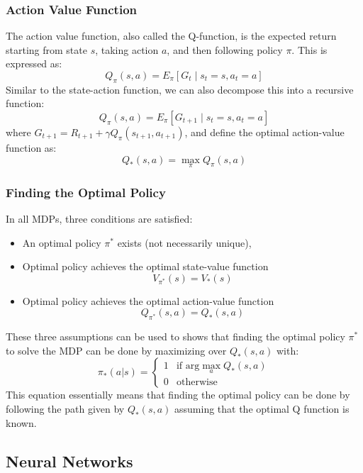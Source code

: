 \subsubsection{Action Value Function}
The action value function, also called the Q-function, is the expected return starting from state \(s\), taking action \(a\), and then following policy \(\pi \). This is expressed as:
\begin{equation}
    Q_\pi(s,a) = E_\pi[G_t \;|\; s_t = s, a_t = a]
\end{equation}
Similar to the state-action function, we can also decompose this into a recursive function:
\begin{equation}
    Q_\pi(s,a) = E_\pi[G_{t+1} \;|\; s_t = s, a_t = a]
\end{equation}
where \(G_{t+1} = R_{t+1} + \gamma Q_\pi(s_{t+1}, a_{t+1})\), and define the optimal action-value function as:
\begin{equation}
    Q_*(s,a) = \max_\pi{Q_\pi(s,a)}
\end{equation}

\subsubsection{Finding the Optimal Policy}
In all MDPs, three conditions are satisfied:
\begin{itemize}
    \item An optimal policy \(\pi^*\) exists (not necessarily unique),
    \item Optimal policy achieves the optimal state-value function
          \begin{equation}
              V_{\pi^*}(s) = V_*(s)
          \end{equation}
    \item Optimal policy achieves the optimal action-value function
          \begin{equation}
              Q_{\pi^*}(s,a) = Q_*(s, a)
          \end{equation}
\end{itemize}
These three assumptions can be used to shows that finding the optimal policy
\(\pi^*\) to solve the MDP can be done by maximizing over \(Q_*(s,a)\) with:
\begin{equation}
    \pi_*(a | s) =
    \begin{cases}
        1 & \text{if arg}\max_a{Q_*(s,a)} \\
        0 & \text{otherwise}
    \end{cases}
\end{equation}
This equation essentially means that finding the optimal policy can be done by
following the path given by \(Q_*(s,a)\) assuming that the optimal Q function is known.

\subsection{Neural Networks}